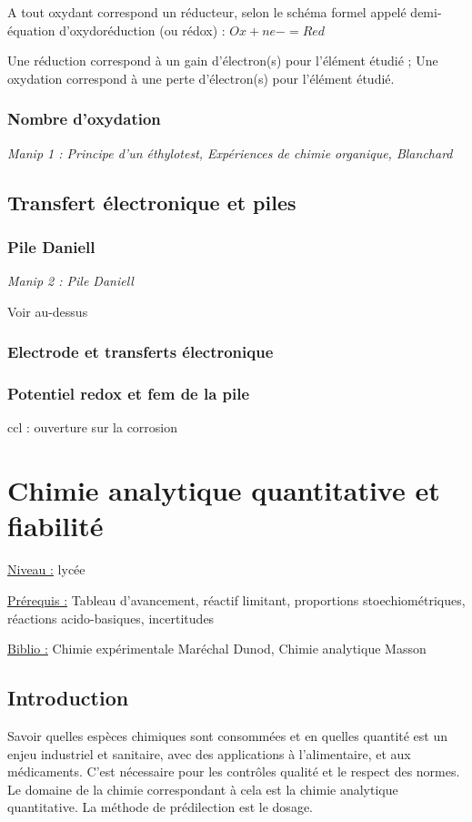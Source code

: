 \documentclass{article}%
\begin{document}
A tout oxydant correspond un réducteur, selon le schéma formel appelé demi-équation d’oxydoréduction
(ou rédox) : $Ox + n e- = Red$

Une réduction correspond à un gain d’électron(s) pour l’élément étudié ;
Une oxydation correspond à une perte d’électron(s) pour l’élément étudié.

\subsubsection{Nombre d'oxydation}

\textit{Manip 1 : Principe d'un éthylotest, Expériences de chimie organique, Blanchard}
\subsection{Transfert électronique et piles}

\subsubsection{Pile Daniell}
\textit{Manip 2 : Pile Daniell}

Voir au-dessus

\subsubsection{Electrode et transferts électronique}

\subsubsection{Potentiel redox et fem de la pile}

ccl : ouverture sur la corrosion
\section{Chimie analytique quantitative et fiabilité}
\underline{Niveau :} lycée

\underline{Prérequis :} Tableau d'avancement, réactif limitant, proportions stoechiométriques, réactions acido-basiques, incertitudes

\underline{Biblio :} Chimie expérimentale Maréchal Dunod, Chimie analytique Masson

\subsection{Introduction}

Savoir quelles espèces chimiques sont consommées et en quelles quantité est un enjeu industriel et sanitaire, avec des applications à l'alimentaire, et aux médicaments. C'est nécessaire pour les contrôles qualité et le respect des normes. Le domaine de la chimie correspondant à cela est la chimie analytique quantitative. La méthode de prédilection est le dosage.
\end{document}
